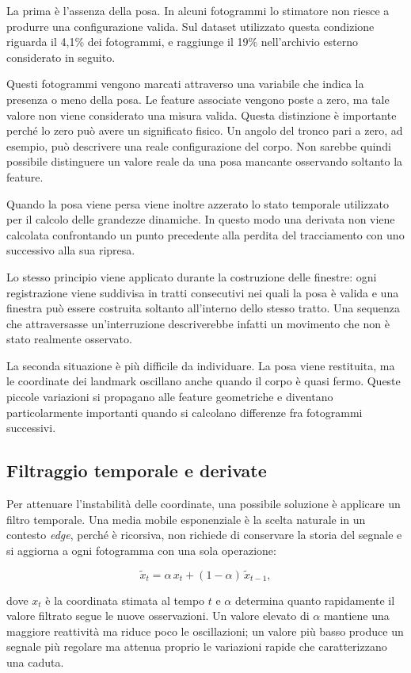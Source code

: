 La prima è l'assenza della posa. In alcuni fotogrammi lo stimatore non riesce a produrre una configurazione valida. Sul dataset utilizzato questa condizione riguarda il 4,1\% dei fotogrammi, e raggiunge il 19\% nell'archivio esterno considerato in seguito.

Questi fotogrammi vengono marcati attraverso una variabile che indica la presenza o meno della posa. Le feature associate vengono poste a zero, ma tale valore non viene considerato una misura valida.
Questa distinzione è importante perché lo zero può avere un significato fisico. Un angolo del tronco pari a zero, ad esempio, può descrivere una reale configurazione del corpo. Non sarebbe quindi possibile distinguere un valore reale da una posa mancante osservando soltanto la feature.

Quando la posa viene persa viene inoltre azzerato lo stato temporale utilizzato per il calcolo delle grandezze dinamiche. In questo modo una derivata non viene calcolata confrontando un punto precedente alla perdita del tracciamento con uno successivo alla sua ripresa.

Lo stesso principio viene applicato durante la costruzione delle finestre: ogni registrazione viene suddivisa in tratti consecutivi nei quali la posa è valida e una finestra può essere costruita soltanto all'interno dello stesso tratto. Una sequenza che attraversasse un'interruzione descriverebbe infatti un movimento che non è stato realmente osservato.

La seconda situazione è più difficile da individuare. La posa viene restituita, ma le coordinate dei landmark oscillano anche quando il corpo è quasi fermo. Queste piccole variazioni si propagano alle feature geometriche e diventano particolarmente importanti quando si calcolano differenze fra fotogrammi successivi.

\subsection{Filtraggio temporale e derivate}

Per attenuare l'instabilità delle coordinate, una possibile soluzione è applicare un filtro temporale. Una media mobile esponenziale è la scelta naturale in un contesto \emph{edge}, perché è ricorsiva, non richiede di conservare la storia del segnale e si aggiorna a ogni fotogramma con una sola operazione:

\[
\tilde{x}_t = \alpha\,x_t + (1-\alpha)\,\tilde{x}_{t-1},
\]

dove $x_t$ è la coordinata stimata al tempo \(t\) e $\alpha$ determina quanto rapidamente il valore filtrato segue le nuove osservazioni. Un valore elevato di $\alpha$ mantiene una maggiore reattività ma riduce poco le oscillazioni; un valore più basso produce un segnale più regolare ma attenua proprio le variazioni rapide che caratterizzano una caduta.

